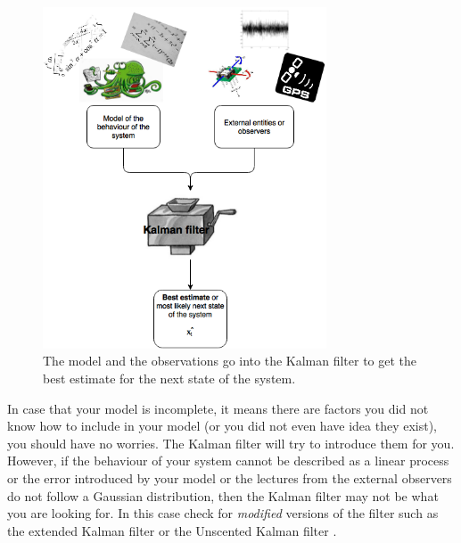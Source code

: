\documentclass[12pt,a4paper,final]{article} %
\begin{document}
\begin{figure}
  \centering
  \includegraphics[width=0.75\textwidth]{kalman_input_output}
  \caption{The model and the observations go into the Kalman filter to
    get the best estimate for the next state of the system.}
  \label{fig:kalman_crank_machine}
\end{figure}

In case that your model is incomplete, it means there are factors you
did not know how to include in your model (or you did not even have
idea they exist), you should have no worries. The Kalman filter will
try to introduce them for you. However, if the behaviour of your
system cannot be described as a linear process or the error introduced
by your model or the lectures from the external observers do not
follow a Gaussian distribution, then the Kalman filter may not be what
you are looking for. In this case check for \textit{modified} versions
of the filter such as the extended Kalman filter \cite{} or the
Unscented Kalman filter \cite{}.
\end{document}
